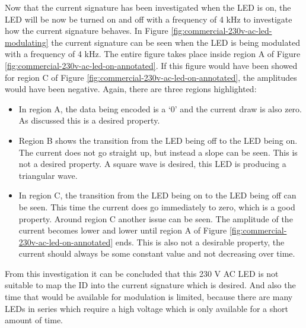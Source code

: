 Now that the current signature has been investigated when the LED is on, the LED will be now be turned on and off with a frequency of 4 kHz to investigate how the current signature behaves.
In Figure \ref{fig:commercial-230v-ac-led-modulating} the current signature can be seen when the LED is being modulated with a frequency of 4 kHz.
The entire figure takes place inside region A of Figure \ref{fig:commercial-230v-ac-led-on-annotated}.
If this figure would have been showed for region C of Figure \ref{fig:commercial-230v-ac-led-on-annotated}, the amplitudes would have been negative.
Again, there are three regions highlighted:

\begin{itemize}

	\item In region A, the data being encoded is a `0' and the current draw is also zero.
	As discussed this is a desired property.

	\item Region B shows the transition from the LED being off to the LED being on.
	The current does not go straight up, but instead a slope can be seen.
	This is not a desired property.
	A square wave is desired, this LED is producing a triangular wave.

	\item In region C, the transition from the LED being on to the LED being off can be seen.
	This time the current does go immediately to zero, which is a good property.
	Around region C another issue can be seen. 
	The amplitude of the current becomes lower and lower until region A of Figure \ref{fig:commercial-230v-ac-led-on-annotated} ends.
	This is also not a desirable property, the current should always be some constant value and not decreasing over time.

\end{itemize} 



From this investigation it can be concluded that this 230 V AC LED is not suitable to map the ID into the current signature which is desired.
And also the time that would be available for modulation is limited, because there are many LEDs in series which require a high voltage which is only available for a short amount of time.








